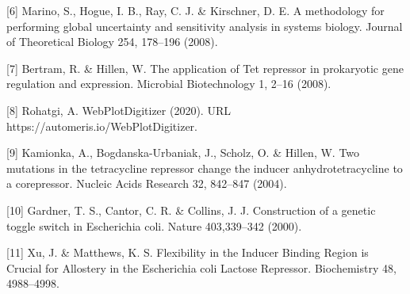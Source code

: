 \documentclass[UTF8]{article}
\begin{document}
[6] Marino, S., Hogue, I. B., Ray, C. J. \& Kirschner, D. E. A methodology for performing global uncertainty and sensitivity analysis in systems biology. Journal of Theoretical Biology 254, 178–196 (2008).

[7] Bertram, R. \& Hillen, W. The application of Tet repressor in prokaryotic gene regulation and expression. Microbial Biotechnology 1, 2–16 (2008).

[8] Rohatgi, A. WebPlotDigitizer (2020). URL https://automeris.io/WebPlotDigitizer.

[9] Kamionka, A., Bogdanska-Urbaniak, J., Scholz, O. \& Hillen, W. Two mutations in the tetracycline repressor change the inducer anhydrotetracycline to a corepressor. Nucleic Acids Research 32, 842–847 (2004).

[10] Gardner, T. S., Cantor, C. R. \& Collins, J. J. Construction of a genetic toggle switch in Escherichia coli. Nature 403,339–342 (2000).

[11] Xu, J. \& Matthews, K. S. Flexibility in the Inducer Binding Region is Crucial for Allostery in the Escherichia coli Lactose Repressor. Biochemistry 48, 4988–4998.
\end{document}
